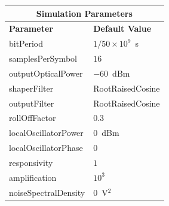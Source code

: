 \begin{table}[H]
	\centering
	\footnotesize
	\begin{tabular}{|l|l|}
		\hline
		\multicolumn{2}{|c|}{ \textbf{Simulation Parameters} } \\
		\hline
		\textbf{Parameter}     & \textbf{Default Value}                                     \\\hline
		bitPeriod              & $1/50\times10^9$~s														\\\hline
		samplesPerSymbol       & $16$                                                       \\\hline
		outputOpticalPower     & $-60$~dBm 													\\ \hline
		shaperFilter	       & RootRaisedCosine												\\ \hline
		outputFilter		   & RootRaisedCosine												\\ \hline
		rollOffFactor		   & 0.3														\\ \hline
		localOscillatorPower   & $0$~dBm                                                    \\ \hline
		localOscillatorPhase   & $0$                                                        \\ \hline
		responsivity           & $1$                                                        \\ \hline
		amplification          & $10^3$                                                     \\ \hline
		noiseSpectralDensity   & $0$~V$^2$                             					\\ \hline
	\end{tabular}
\end{table}
